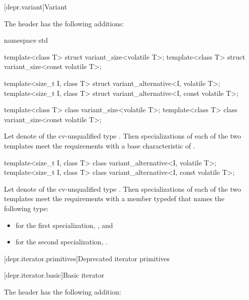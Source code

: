[depr.variant]{Variant}

\pnum
The header  has the following additions:

\begin{codeblock}
namespace std {
  template<class T> struct variant_size<volatile T>;
  template<class T> struct variant_size<const volatile T>;

  template<size_t I, class T> struct variant_alternative<I, volatile T>;
  template<size_t I, class T> struct variant_alternative<I, const volatile T>;
}
\end{codeblock}

\begin{itemdecl}
template<class T> class variant_size<volatile T>;
template<class T> class variant_size<const volatile T>;
\end{itemdecl}

\begin{itemdescr}
\pnum
Let  denote 
of the cv-unqualified type .
Then specializations of each of the two templates meet
the  requirements
with a base characteristic of .
\end{itemdescr}

\begin{itemdecl}
template<size_t I, class T> class variant_alternative<I, volatile T>;
template<size_t I, class T> class variant_alternative<I, const volatile T>;
\end{itemdecl}

\begin{itemdescr}
\pnum
Let  denote 
of the cv-unqualified type .
Then specializations of each of the two templates meet
the  requirements
with a member typedef  that names the following type:
\begin{itemize}
\item for the first specialization, , and
\item for the second specialization, .
\end{itemize}
\end{itemdescr}

[depr.iterator.primitives]{Deprecated iterator primitives}

[depr.iterator.basic]{Basic iterator}

\pnum
The header  has the following addition:

